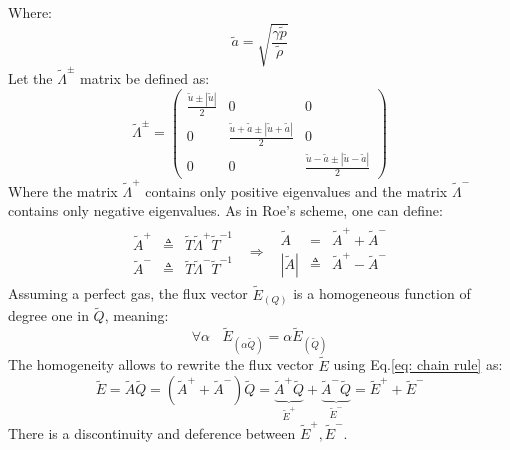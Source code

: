 \documentclass[11pt, a4paper]{article}
\begin{document}
Where:
\begin{equation*}
    \tilde{a}=\sqrt{\frac{\gamma\tilde{p}}{\tilde{\rho}}}
\end{equation*}
Let the $\tilde{\Lambda}^\pm$ matrix be defined as:
\begin{equation}
    \tilde{\Lambda}^\pm=\begin{pmatrix}
        \displaystyle\frac{\tilde{u}\pm\left|\tilde{u}\right|}{2} & 0 & 0 \\
        0 & \displaystyle\frac{\tilde{u}+\tilde{a}\pm\left|\tilde{u}+\tilde{a}\right|}{2} & 0 \\
        0 & 0 & \displaystyle\frac{\tilde{u}-\tilde{a}\pm\left|\tilde{u}-\tilde{a}\right|}{2}
    \end{pmatrix}
\end{equation}
Where the matrix $\tilde{\Lambda}^+$ contains only positive eigenvalues and the matrix $\tilde{\Lambda}^-$ contains only negative eigenvalues. As in Roe's scheme, one can define:
\begin{equation}
    \begin{matrix}
        \begin{array}{ccl}
            \tilde{A}^+ & \triangleq & \tilde{T}\tilde{\Lambda}^+\tilde{T}^{-1} \\
            \tilde{A}^- & \triangleq & \tilde{T}\tilde{\Lambda}^-\tilde{T}^{-1}
        \end{array} & \Rightarrow & \begin{array}{ccl}
            \tilde{A} & = & \tilde{A}^++\tilde{A}^- \\
            \left|\tilde{A}\right| & \triangleq & \tilde{A}^+-\tilde{A}^-
        \end{array}
    \end{matrix}
\end{equation}
Assuming a perfect gas, the flux vector $\tilde{E}_{\left(Q\right)}$ is a homogeneous function of degree one in $\tilde{Q}$, meaning:$$\forall\alpha\ \ \ \ \tilde{E}_{\left(\alpha \tilde{Q}\right)}=\alpha \tilde{E}_{\left(\tilde{Q}\right)}$$The homogeneity allows to rewrite the flux vector $\tilde{E}$ using Eq.\ref{eq: chain rule} as:
\begin{equation}
    \tilde{E}=\tilde{A}\tilde{Q}=\left(\tilde{A}^++\tilde{A}^-\right)\tilde{Q}=\underbrace{\tilde{A}^+\tilde{Q}}_{\displaystyle\tilde{E}^+}+\underbrace{\tilde{A}^-\tilde{Q}}_{\displaystyle\tilde{E}^-}=\tilde{E}^++\tilde{E}^-
    \label{eq: E vector splitting}
\end{equation} 
There is a discontinuity and deference between $\tilde{E}^+,\tilde{E}^-$.
\end{document}

